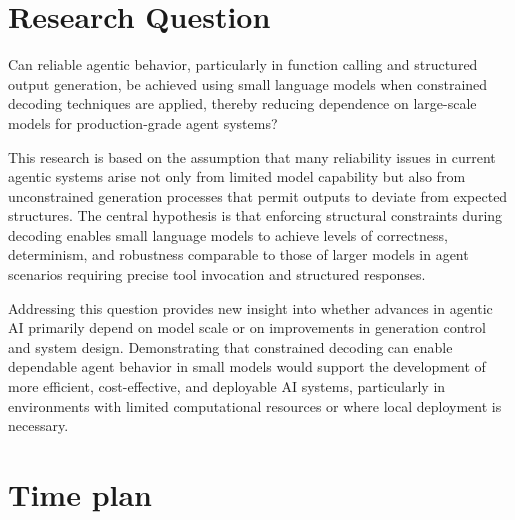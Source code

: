 \documentclass{article}
\begin{document}
\section*{Research Question}

Can reliable agentic behavior, particularly in function calling and structured
output generation, be achieved using small language models when constrained
decoding techniques are applied, thereby reducing dependence on large-scale
models for production-grade agent systems?

This research is based on the assumption that many reliability issues in
current agentic systems arise not only from limited model capability but also
from unconstrained generation processes that permit outputs to deviate from
expected structures.
The central hypothesis is that enforcing structural constraints during
decoding enables small language models to achieve levels of correctness,
determinism, and robustness comparable to those of larger models in agent
scenarios requiring precise tool invocation and structured responses.

Addressing this question provides new insight into whether advances in
agentic AI primarily depend on model scale or on improvements in generation
control and system design.
Demonstrating that constrained decoding can enable dependable agent behavior
in small models would support the development of more efficient,
cost-effective, and deployable AI systems, particularly in environments with
limited computational resources or where local deployment is necessary.

\section*{Time plan}
\end{document}
